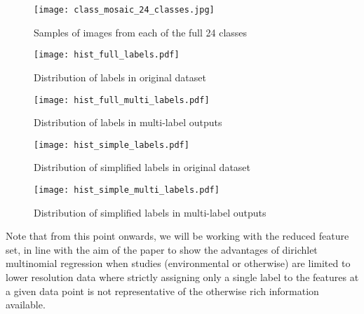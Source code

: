 \begin{figure}
    \texttt{[image: class\_mosaic\_24\_classes.jpg]}
    \caption{Samples of images from each of the full 24 classes}
    \label{fig:24classes}
\end{figure}

\begin{figure}[H]
    \begin{minipage}{.47\linewidth}
        \texttt{[image: hist\_full\_labels.pdf]}
        \caption{Distribution of labels in original dataset}
        \label{fig:singlelabeldistr}
    \end{minipage}
    \hfill
    \begin{minipage}{.47\linewidth}
        \texttt{[image: hist\_full\_multi\_labels.pdf]}
        \caption{Distribution of labels in multi-label outputs}
        \label{fig:multilabeldistr}
    \end{minipage}
\end{figure}

\begin{figure}[H]
    \begin{minipage}{.47\linewidth}
        \texttt{[image: hist\_simple\_labels.pdf]}
        \caption{Distribution of simplified labels in original dataset}
        \label{fig:singlelabeldistr}
    \end{minipage}
    \hfill
    \begin{minipage}{.47\linewidth}
        \texttt{[image: hist\_simple\_multi\_labels.pdf]}
        \caption{Distribution of simplified labels in multi-label outputs}
        \label{fig:multilabeldistr}
    \end{minipage}
\end{figure}

Note that from this point onwards, we will be working with the reduced feature set, in line with the aim of the paper to show the advantages of dirichlet multinomial regression when studies (environmental or otherwise) are limited to lower resolution data where strictly assigning only a single label to the features at a given data point is not representative of the otherwise rich information available.

